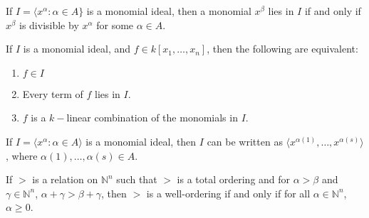 \documentclass[crop=false,class=book,oneside]{standalone}
\begin{document}
                \begin{theorem}
                    If $I=\langle x^\alpha: \alpha \in A\}$ is
                    a monomial ideal, then a monomial $x^\beta$ lies
                    in $I$ if and only if $x^\beta$ is divisible by
                    $x^\alpha$ for some $\alpha \in A$.
                \end{theorem}
                \begin{theorem}
                    If $I$ is a monomial ideal, and
                    $f\in{k}[x_{1},\hdots,x_{n}]$, then
                    the following are equivalent:
                    \begin{enumerate}
                            \item $f\in I$
                            \item Every term of $f$ lies in $I$.
                            \item $f$ is a $k-$linear combination
                                  of the monomials in $I$.
                    \end{enumerate}
                \end{theorem}
                \begin{theorem}
                    If $I=\langle{x}^{\alpha}:\alpha\in{A}\rangle$
                    is a monomial ideal, then $I$ can be written as
                    $\langle{x}^{\alpha(1)},\hdots,x^{\alpha(s)}\rangle$,
                    where $\alpha(1),\hdots,\alpha(s)\in{A}$. 
                \end{theorem}
                \begin{theorem}
                    If $>$ is a relation on $\mathbb{N}^n$
                    such that $>$ is a total ordering and for
                    $\alpha>\beta$ and $\gamma\in\mathbb{N}^n$,
                    $\alpha+\gamma>\beta+\gamma$, then $>$ is a
                    well-ordering if and only if for all
                    $\alpha\in\mathbb{N}^n$, $\alpha\geq{0}$.
                \end{theorem}
\end{document}
